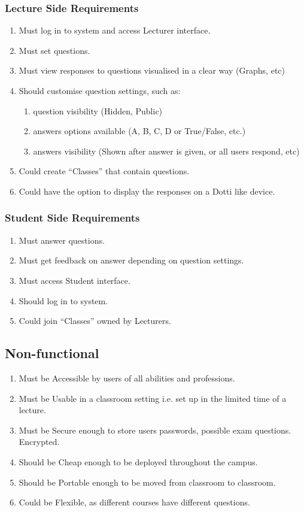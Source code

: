 \documentclass{article}
\begin{document}
\subsubsection{Lecture Side Requirements}
\begin{enumerate}
	\item Must log in to system and access Lecturer interface.
	\item Must set questions.
	\item Must view responses to questions visualised in a clear way (Graphs, etc)
	\item Should customise question settings, such as: 
	\begin{enumerate}
		\item question visibility (Hidden, Public)
		\item answers options available (A, B, C, D or True/False, etc.)
		\item answers visibility (Shown after answer is given, or all users respond, etc)
	\end{enumerate}
	\item Could create ``Classes'' that contain questions.
	\item Could have the option to display the responses on a Dotti like device.
\end{enumerate}
\subsubsection{Student Side Requirements}
\begin{enumerate}
	\item Must answer questions.
	\item Must get feedback on answer depending on question settings.
	\item Must access Student interface.
	\item Should log in to system.
	\item Could join ``Classes'' owned by Lecturers.
\end{enumerate}

\subsection{Non-functional}
\begin{enumerate}
	\item Must be Accessible by users of all abilities and professions.
	\item Must be Usable in a classroom setting i.e. set up in the limited time of a lecture.
	\item Must be Secure enough to store users passwords, possible exam questions. Encrypted.
	\item Should be Cheap enough to be deployed throughout the campus.
	\item Should be Portable enough to be moved from classroom to classroom.
	\item Could be Flexible, as different courses have different questions.
\end{enumerate}
\end{document}
